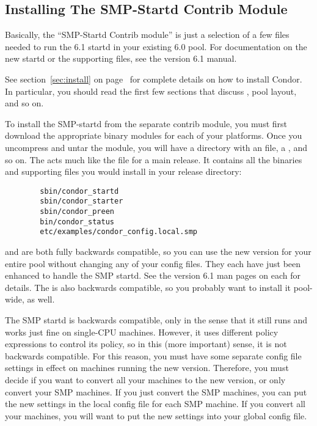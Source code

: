 \subsection{\label{sec:SMP-install}Installing The SMP-Startd Contrib
Module} 

Basically, the ``SMP-Startd Contrib module'' is just a selection of a
few files needed to run the 6.1 startd in your existing 6.0 pool.
For documentation on the new startd or the supporting files, see the
version 6.1 manual.

See section~\ref{sec:install} on page~\pageref{sec:install} for
complete details on how to install Condor.
In particular, you should read the first few sections that discuss
, pool layout, and so on.

To install the SMP-startd from the separate contrib module, you must
first download the appropriate binary modules for each of your
platforms.  
Once you uncompress and untar the module, you will have a directory
with an  file, a , and so on.
The  acts much like the  file
for a main release.
It contains all the binaries and supporting files you would install in
your release directory:
\begin{verbatim}
        sbin/condor_startd
        sbin/condor_starter
        sbin/condor_preen
        bin/condor_status
        etc/examples/condor_config.local.smp
\end{verbatim}

 and  are both fully backwards
compatible, so you can use the new version for your entire pool
without changing any of your config files.  
They each have just been enhanced to handle the SMP startd.
See the version 6.1 man pages on each for details.
The  is also backwards compatible, so you probably
want to install it pool-wide, as well.

The SMP startd is backwards compatible, only in the sense that it
still runs and works just fine on single-CPU machines.
However, it uses different policy expressions to control its policy,
so in this (more important) sense, it is not backwards compatible.
For this reason, you must have some separate config file settings in
effect on machines running the new version.
Therefore, you must decide if you want to convert all your machines to
the new version, or only convert your SMP machines.
If you just convert the SMP machines, you can put the new settings in
the local config file for each SMP machine.
If you convert all your machines, you will want to put the new
settings into your global config file.


